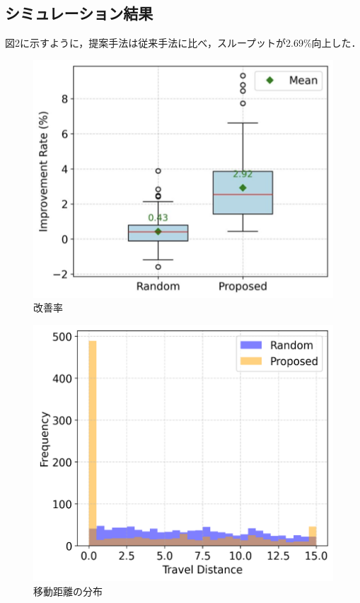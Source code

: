 \documentclass[dvipdfmx,twocolumn]{jsarticle}
\begin{document}
\subsection{シミュレーション結果}
図2に示すように，提案手法は従来手法に比べ，スループットが2.69\%向上した．
\begin{figure}[H]
 \centering
 \vspace{-5mm} %
 \includegraphics[width=0.8\linewidth]{boxplot_50_50.png}
  \vspace{-2mm} %
 \caption{{改善率}}
  \vspace{-6mm} %
\end{figure}
\begin{figure}[H]
 \centering
  \vspace{-5mm} %
 \includegraphics[width=0.8\linewidth]{hist.png}
  \vspace{-2mm} %
 \caption{{移動距離の分布}}
  \vspace{-6mm} %
\end{figure}
\end{document}
